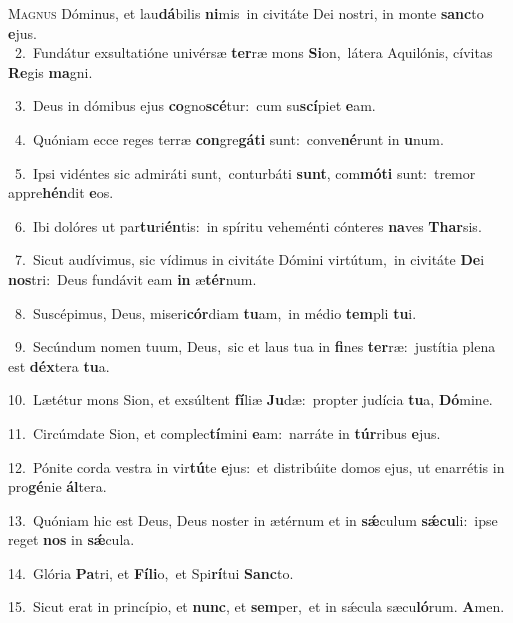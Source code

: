 \lettrine{\initial\textcolor{\initialcolor}{M}}{agnus} Dóminus, et lau\-\textbf{dá}\-bilis \textbf{ni}\-mis~\star in civitáte Dei nostri, in monte \textbf{sanc}\-to \textbf{e}\-jus.\\
{\numbfont\textcolor{\numbcolor}{~2.}}~Fundátur exsultatióne univérsæ \textbf{ter}\-ræ mons \textbf{Si}\-on,~\star látera Aquilónis, cívitas \textbf{Re}\-gis \textbf{ma}\-gni.\par
{\numbfont\textcolor{\numbcolor}{~3.}}~Deus in dómibus ejus \textbf{co}\-gno\-\textbf{scé}\-tur:~\star cum su\-\textbf{scí}\-piet \textbf{e}\-am.\par
{\numbfont\textcolor{\numbcolor}{~4.}}~Quóniam ecce reges terræ \textbf{con}\-gre\-\textbf{gá}\-\textbf{ti} sunt:~\star conve\-\textbf{né}\-runt in \textbf{u}\-num.\par
{\numbfont\textcolor{\numbcolor}{~5.}}~Ipsi vidéntes sic admiráti sunt,~\dagger conturbáti \textbf{sunt}\-, com\-\textbf{mó}\-\textbf{ti} sunt:~\star tremor appre\-\textbf{hén}\-dit \textbf{e}\-os.\par
{\numbfont\textcolor{\numbcolor}{~6.}}~Ibi dolóres ut par\-\textbf{tu}\-ri\-\textbf{én}\-tis:~\star in spíritu veheménti cónteres \textbf{na}\-ves \textbf{Thar}\-sis.\par
{\numbfont\textcolor{\numbcolor}{~7.}}~Sicut audívimus, sic vídimus in civitáte Dómini virtútum,~\dagger in civitáte \textbf{De}\-i \textbf{nos}\-tri:~\star Deus fundávit eam \textbf{in} æ\-\textbf{tér}\-num.\par
{\numbfont\textcolor{\numbcolor}{~8.}}~Suscépimus, Deus, miseri\-\textbf{cór}\-diam \textbf{tu}\-am,~\star in médio \textbf{tem}\-pli \textbf{tu}\-i.\par
{\numbfont\textcolor{\numbcolor}{~9.}}~Secúndum nomen tuum, Deus,~\dagger sic et laus tua in \textbf{fi}\-nes \textbf{ter}\-ræ:~\star justítia plena est \textbf{déx}\-tera \textbf{tu}\-a.\par
{\numbfont\textcolor{\numbcolor}{10.}}~Lætétur mons Sion, et exsúltent \textbf{fí}\-liæ \textbf{Ju}\-dæ:~\star propter judícia \textbf{tu}\-a, \textbf{Dó}\-mine.\par
{\numbfont\textcolor{\numbcolor}{11.}}~Circúmdate Sion, et complec\-\textbf{tí}\-mini \textbf{e}\-am:~\star narráte in \textbf{túr}\-ribus \textbf{e}\-jus.\par
{\numbfont\textcolor{\numbcolor}{12.}}~Pónite corda vestra in vir\-\textbf{tú}\-te \textbf{e}\-jus:~\star et distribúite domos ejus, ut enarrétis in pro\-\textbf{gé}\-nie \textbf{ál}\-tera.\par
{\numbfont\textcolor{\numbcolor}{13.}}~Quóniam hic est Deus, Deus noster in ætérnum et in \textbf{sǽ}\-culum \textbf{sǽ}\-\textbf{cu}li:~\star ipse reget \textbf{nos} in \textbf{sǽ}\-cula.\par
{\numbfont\textcolor{\numbcolor}{14.}}~Glória \textbf{Pa}\-tri, et \textbf{Fí}\-\textbf{li}o,~\star et Spi\-\textbf{rí}\-tui \textbf{Sanc}\-to.\par
{\numbfont\textcolor{\numbcolor}{15.}}~Sicut erat in princípio, et \textbf{nunc}\-, et \textbf{sem}\-per,~\star et in sǽcula sæcu\-\textbf{ló}\-rum. \textbf{A}\-men.\par
